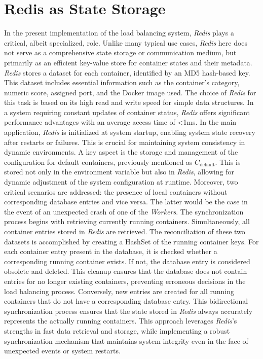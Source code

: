 \documentclass[twocolumn]{webofc}
\begin{document}
\section{Redis as State Storage}
In the present implementation of the load balancing system, \textit{Redis} plays a critical, albeit specialized, role. Unlike many typical use cases, \textit{Redis} here does not serve as a comprehensive state storage or communication medium, but primarily as an efficient key-value store for container states and their metadata. \textit{Redis} stores a dataset for each container, identified by an MD5 hash-based key. This dataset includes essential information such as the container's category, numeric score, assigned port, and the Docker image used. The choice of \textit{Redis} for this task is based on its high read and write speed for simple data structures.
In a system requiring constant updates of container status, \textit{Redis} offers significant performance advantages with an average access time of <1ms\cite{redis_docs}. In the main application, \textit{Redis} is initialized at system startup, enabling system state recovery after restarts or failures. This is crucial for maintaining system consistency in dynamic environments. A key aspect is the storage and management of the configuration for default containers, previously mentioned as \( C_{\text{default}} \). This is stored not only in the environment variable but also in \textit{Redis}, allowing for dynamic adjustment of the system configuration at runtime. Moreover, two critical scenarios are addressed: the presence of local containers without corresponding database entries and vice versa. The latter would be the case in the event of an unexpected crash of one of the \textit{Workers}. The synchronization process begins with retrieving currently running containers. Simultaneously, all container entries stored in \textit{Redis} are retrieved. The reconciliation of these two datasets is accomplished by creating a HashSet of the running container keys. For each container entry present in the database, it is checked whether a corresponding running container exists. If not, the database entry is considered obsolete and deleted. This cleanup ensures that the database does not contain entries for no longer existing containers, preventing erroneous decisions in the load balancing process. Conversely, new entries are created for all running containers that do not have a corresponding database entry. This bidirectional synchronization process ensures that the state stored in \textit{Redis} always accurately represents the actually running containers. This approach leverages \textit{Redis}'s strengths in fast data retrieval and storage, while implementing a robust synchronization mechanism that maintains system integrity even in the face of unexpected events or system restarts.
\end{document}
